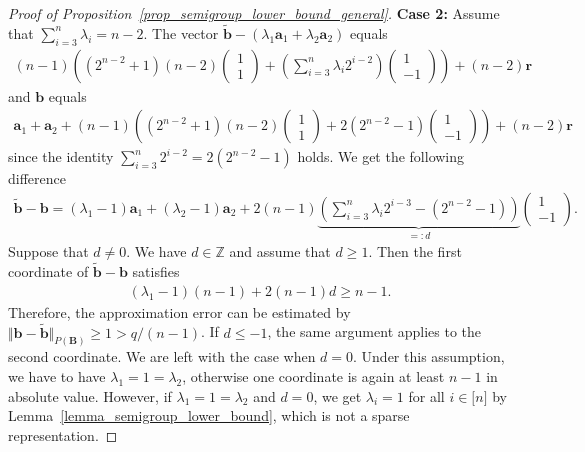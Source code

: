 \documentclass[pdflatex]{sn-jnl}
\newcommand{\Z}{\mathbb{Z}}
\newcommand{\bb}{\bm{b}}
\newcommand{\ba}{\bm{a}}
\newcommand{\br}{\bm{r}}
\newcommand{\bB}{\bm{B}}
\theoremstyle{thmstyleone}%
\theoremstyle{thmstyletwo}%
\theoremstyle{thmstylethree}%
\begin{document}
\begin{proof}[Proof of Proposition~\ref{prop_semigroup_lower_bound_general}]
		\textbf{Case 2:} Assume that $\sum_{i=3}^n\lambda_i = n-2$. 
		The vector $\tilde{\bb} - (\lambda_1\ba_1 + \lambda_2\ba_2)$ equals
		\begin{align*}
			(n-1)\left((2^{n-2} + 1) (n-2) \begin{pmatrix}
				1 \\ 1
			\end{pmatrix}
			+ \left(\sum_{i=3}^{n}\lambda_i2^{i-2}\right)\begin{pmatrix}
				1 \\ -1
			\end{pmatrix}\right) + (n-2)\br
		\end{align*}
		and $\bb$ equals
		\begin{align*}
			\ba_1 + \ba_2 + (n-1)\left((2^{n-2} + 1) (n-2)\begin{pmatrix}
				1 \\ 1
			\end{pmatrix} + 2\left(2^{n-2} - 1\right)\begin{pmatrix}
				1 \\ -1
			\end{pmatrix}\right) + (n-2)\br
		\end{align*}
		since the identity $\sum_{i=3}^n2^{i-2} = 2(2^{n-2} - 1)$ holds.
		We get the following difference
		\begin{align*}
			\tilde{\bb} - \bb = (\lambda_1 - 1)\ba_1 + (\lambda_2 - 1)\ba_2 + 2 (n-1)\underbrace{\left(\sum_{i=3}^{n}\lambda_i2^{i-3} - (2^{n-2} - 1)\right)}_{=:d}\begin{pmatrix}
				1 \\ -1
			\end{pmatrix}.
		\end{align*}
		Suppose that $d\neq 0$. We have $d\in\Z$ and assume that $d\geq 1$. Then the first coordinate of $\tilde{\bb}-\bb$ satisfies 
		\begin{align*}
			(\lambda_1 - 1)(n-1) + 2(n-1)d \geq n-1.
		\end{align*}
		Therefore, the approximation error can be estimated by $\Vert \bb - \tilde{\bb}\Vert_{P(\bB)}\geq 1 > q/(n-1)$. If $d\leq -1$, the same argument applies to the second coordinate. 
		We are left with the case when $d = 0$. Under this assumption, we have to have $\lambda_1 = 1 = \lambda_2$, otherwise one coordinate is again at least $n-1$ in absolute value. However, if $\lambda_1 = 1 = \lambda_2$ and $d=0$, we get $\lambda_i = 1$ for all $i\in\lbrack n\rbrack$ by Lemma~\ref{lemma_semigroup_lower_bound}, which is not a sparse representation.
		

\end{proof}
\end{document}
